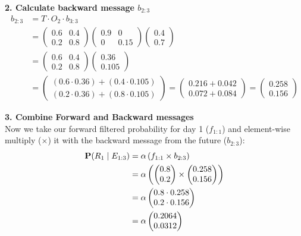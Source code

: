 \textbf{2. Calculate backward message $b_{2:3}$}
\begin{align*}
b_{2:3} &= T \cdot O_2 \cdot b_{3:3} \\
&= \begin{pmatrix}
0.6 & 0.4 \\
0.2 & 0.8
\end{pmatrix}
\begin{pmatrix}
0.9 & 0 \\
0 & 0.15
\end{pmatrix}
\begin{pmatrix}
0.4 \\ 
0.7
\end{pmatrix} \\
&= \begin{pmatrix}
0.6 & 0.4 \\
0.2 & 0.8
\end{pmatrix}
\begin{pmatrix}
0.36 \\
0.105
\end{pmatrix} \\
&= \begin{pmatrix}
(0.6 \cdot 0.36) + (0.4 \cdot 0.105) \\
(0.2 \cdot 0.36) + (0.8 \cdot 0.105)
\end{pmatrix}
= \begin{pmatrix}
0.216 + 0.042 \\
0.072 + 0.084
\end{pmatrix}
= \begin{pmatrix}
0.258 \\
0.156
\end{pmatrix}
\end{align*}

\textbf{3. Combine Forward and Backward messages} \\
Now we take our forward filtered probability for day 1 ($f_{1:1}$) and element-wise multiply ($\times$) it with the backward message from the future ($b_{2:3}$):
\begin{align*}
\textbf{P}(R_1 \mid E_{1:3}) &= \alpha \left( f_{1:1} \times b_{2:3} \right) \\
&= \alpha \left( 
\begin{pmatrix} 0.8 \\ 0.2 \end{pmatrix} 
\times 
\begin{pmatrix} 0.258 \\ 0.156 \end{pmatrix} 
\right) \\
&= \alpha \begin{pmatrix} 0.8 \cdot 0.258 \\ 0.2 \cdot 0.156 \end{pmatrix} \\
&= \alpha \begin{pmatrix} 0.2064 \\ 0.0312 \end{pmatrix}
\end{align*}

